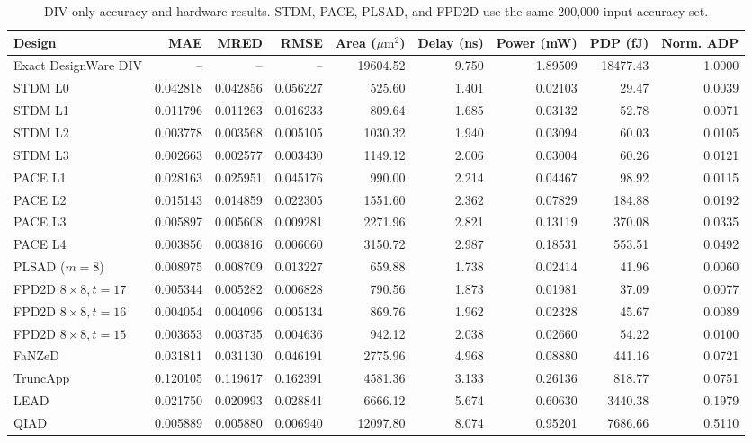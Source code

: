\documentclass[conference]{IEEEtran}
\newcommand{\um}{\ensuremath{\mu\mathrm{m}^2}}
\begin{document}
\begin{table}[!t]
\caption{DIV-only accuracy and hardware results. STDM, PACE, PLSAD, and FPD2D
use the same 200,000-input accuracy set.}
\label{tab:div_comparison}
\centering\scriptsize
\setlength{\tabcolsep}{2.4pt}
\begin{tabular}{lrrrrrrrr}
\toprule
Design & MAE & MRED & RMSE & Area (\um) & Delay (ns) & Power (mW) & PDP (fJ) & Norm. ADP \\
\midrule
Exact DesignWare DIV & -- & -- & -- & 19604.52 & 9.750 & 1.89509 & 18477.43 & 1.0000 \\
\midrule
STDM L0 & 0.042818 & 0.042856 & 0.056227 & 525.60 & 1.401 & 0.02103 & 29.47 & 0.0039 \\
STDM L1 & 0.011796 & 0.011263 & 0.016233 & 809.64 & 1.685 & 0.03132 & 52.78 & 0.0071 \\
STDM L2 & 0.003778 & 0.003568 & 0.005105 & 1030.32 & 1.940 & 0.03094 & 60.03 & 0.0105 \\
STDM L3 & 0.002663 & 0.002577 & 0.003430 & 1149.12 & 2.006 & 0.03004 & 60.26 & 0.0121 \\
\midrule
PACE L1 & 0.028163 & 0.025951 & 0.045176 & 990.00 & 2.214 & 0.04467 & 98.92 & 0.0115 \\
PACE L2 & 0.015143 & 0.014859 & 0.022305 & 1551.60 & 2.362 & 0.07829 & 184.88 & 0.0192 \\
PACE L3 & 0.005897 & 0.005608 & 0.009281 & 2271.96 & 2.821 & 0.13119 & 370.08 & 0.0335 \\
PACE L4 & 0.003856 & 0.003816 & 0.006060 & 3150.72 & 2.987 & 0.18531 & 553.51 & 0.0492 \\
\midrule
PLSAD ($m=8$) & 0.008975 & 0.008709 & 0.013227 & 659.88 & 1.738 & 0.02414 & 41.96 & 0.0060 \\
FPD2D $8\times8,t=17$ & 0.005344 & 0.005282 & 0.006828 & 790.56 & 1.873 & 0.01981 & 37.09 & 0.0077 \\
FPD2D $8\times8,t=16$ & 0.004054 & 0.004096 & 0.005134 & 869.76 & 1.962 & 0.02328 & 45.67 & 0.0089 \\
FPD2D $8\times8,t=15$ & 0.003653 & 0.003735 & 0.004636 & 942.12 & 2.038 & 0.02660 & 54.22 & 0.0100 \\
\midrule
FaNZeD & 0.031811 & 0.031130 & 0.046191 & 2775.96 & 4.968 & 0.08880 & 441.16 & 0.0721 \\
TruncApp & 0.120105 & 0.119617 & 0.162391 & 4581.36 & 3.133 & 0.26136 & 818.77 & 0.0751 \\
LEAD & 0.021750 & 0.020993 & 0.028841 & 6666.12 & 5.674 & 0.60630 & 3440.38 & 0.1979 \\
QIAD & 0.005889 & 0.005880 & 0.006940 & 12097.80 & 8.074 & 0.95201 & 7686.66 & 0.5110 \\
\bottomrule
\end{tabular}
\end{table}
\end{document}
